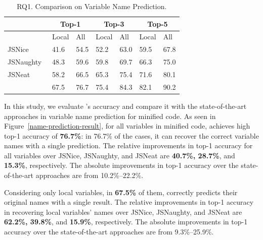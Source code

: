 \begin{table}[thbp]
  \caption{RQ1. Comparison on Variable Name Prediction.}
  \vspace{-5pt}
	\begin{center}
		\small
		\renewcommand{\arraystretch}{1} \begin{tabular}{|p{1.9cm}<{\centering}|p{0.65cm}<{\centering}|p{0.65cm}<{\centering}|p{0.65cm}<{\centering}|p{0.65cm}<{\centering}|p{0.65cm}<{\centering}|p{0.65cm}<{\centering}|}
			
			\hline
                       & \multicolumn{2}{c|}{Top-1}         & \multicolumn{2}{c|}{Top-3}         & \multicolumn{2}{c|}{Top-5} \\
			\hline
                       & Local & All & Local & All & Local & All  \\ 
			\hline
		        JSNice~\cite{JSNice2015} &  41.6    & 54.5  & 52.2 &    63.0   & 59.5      &   67.8    \\
			JSNaughty~\cite{JSNaughty2017}  &   48.3   &  59.6    &  59.8    &  69.7    &  66.3    &   75.0    \\
			JSNeat~\cite{icse19}  &   58.2   &  66.5    &  65.3    & 75.4     &  71.6    & 80.1     \\
			\hline
			{\bf {\tool}} & 67.5 & 76.7 & 75.4 & 84.3 & 82.1 & 90.2 \\
			\hline
		\end{tabular}
		\label{name-result}
	\end{center}
\end{table}


In this study, we evaluate {\tool}'s accuracy and compare it with the
state-of-the-art approaches in variable name prediction for minified
code.
As seen in Figure~\ref{name-prediction-result}, for all variables in
minified code, {\tool} achieves high top-1 accuracy of {\bf 76.7\%}:
in 76.7\% of the cases, it can recover the correct variable names with
a single prediction. The relative improvements in top-1 accuracy for
all variables over JSNice, JSNaughty, and JSNeat are {\bf 40.7\%,
  28.7\%}, and {\bf 15.3\%}, respectively. The absolute improvements
in top-1 accuracy over the state-of-the-art approaches are from
10.2\%--22.2\%.

Considering only local variables, in {\bf 67.5\%} of them, {\tool}
correctly predicts their original names with a single result. The
relative improvements in top-1 accuracy in recovering local variables'
names over JSNice, JSNaughty, and JSNeat are {\bf 62.2\%, 39.8\%}, and
{\bf 15.9\%}, respectively. The absolute improvements in top-1
accuracy over the state-of-the-art approaches are from 9.3\%--25.9\%.


